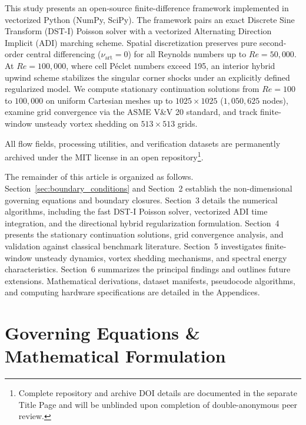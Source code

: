 \documentclass[11pt,a4paper]{article}
\begin{document}
This study presents an open-source finite-difference framework implemented in vectorized Python (NumPy, SciPy). The framework pairs an exact Discrete Sine Transform (DST-I) Poisson solver with a vectorized Alternating Direction Implicit (ADI) marching scheme. Spatial discretization preserves pure second-order central differencing ($\nu_{\text{art}} = 0$) for all Reynolds numbers up to $Re = 50{,}000$. At $Re = 100{,}000$, where cell P\'eclet numbers exceed 195, an interior hybrid upwind scheme stabilizes the singular corner shocks under an explicitly defined regularized model. We compute stationary continuation solutions from $Re = 100$ to $100{,}000$ on uniform Cartesian meshes up to $1025 \times 1025$ ($1{,}050{,}625$ nodes), examine grid convergence via the ASME V\&V 20 standard, and track finite-window unsteady vortex shedding on $513 \times 513$ grids.

All flow fields, processing utilities, and verification datasets are permanently archived under the MIT license in an open repository\footnote{Complete repository and archive DOI details are documented in the separate Title Page and will be unblinded upon completion of double-anonymous peer review.}.

The remainder of this article is organized as follows. Section~\ref{sec:boundary_conditions} and Section~2 establish the non-dimensional governing equations and boundary closures. Section~3 details the numerical algorithms, including the fast DST-I Poisson solver, vectorized ADI time integration, and the directional hybrid regularization formulation. Section~4 presents the stationary continuation solutions, grid convergence analysis, and validation against classical benchmark literature. Section~5 investigates finite-window unsteady dynamics, vortex shedding mechanisms, and spectral energy characteristics. Section~6 summarizes the principal findings and outlines future extensions. Mathematical derivations, dataset manifests, pseudocode algorithms, and computing hardware specifications are detailed in the Appendices.

\section{Governing Equations \& Mathematical Formulation}
\end{document}
